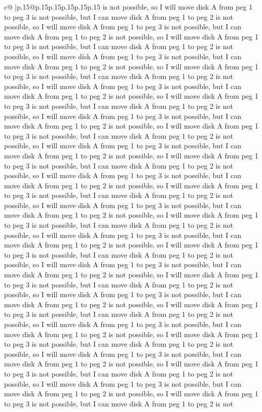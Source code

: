 \documentclass{article}
\begin{document}
{\begin{supertabular}{c@{$\;$}|p{.15\linewidth}@{}p{.15\linewidth}p{.15\linewidth}p{.15\linewidth}p{.15\linewidth}p{.15\linewidth}}
{{{is not possible, so I will move disk A from peg 1 to peg 3 is not possible, but I can move disk A from peg 1 to peg 2 is not possible, so I will move disk A from peg 1 to peg 3 is not possible, but I can move disk A from peg 1 to peg 2 is not possible, so I will move disk A from peg 1 to peg 3 is not possible, but I can move disk A from peg 1 to peg 2 is not possible, so I will move disk A from peg 1 to peg 3 is not possible, but I can move disk A from peg 1 to peg 2 is not possible, so I will move disk A from peg 1 to peg 3 is not possible, but I can move disk A from peg 1 to peg 2 is not possible, so I will move disk A from peg 1 to peg 3 is not possible, but I can move disk A from peg 1 to peg 2 is not possible, so I will move disk A from peg 1 to peg 3 is not possible, but I can move disk A from peg 1 to peg 2 is not possible, so I will move disk A from peg 1 to peg 3 is not possible, but I can move disk A from peg 1 to peg 2 is not possible, so I will move disk A from peg 1 to peg 3 is not possible, but I can move disk A from peg 1 to peg 2 is not possible, so I will move disk A from peg 1 to peg 3 is not possible, but I can move disk A from peg 1 to peg 2 is not possible, so I will move disk A from peg 1 to peg 3 is not possible, but I can move disk A from peg 1 to peg 2 is not possible, so I will move disk A from peg 1 to peg 3 is not possible, but I can move disk A from peg 1 to peg 2 is not possible, so I will move disk A from peg 1 to peg 3 is not possible, but I can move disk A from peg 1 to peg 2 is not possible, so I will move disk A from peg 1 to peg 3 is not possible, but I can move disk A from peg 1 to peg 2 is not possible, so I will move disk A from peg 1 to peg 3 is not possible, but I can move disk A from peg 1 to peg 2 is not possible, so I will move disk A from peg 1 to peg 3 is not possible, but I can move disk A from peg 1 to peg 2 is not possible, so I will move disk A from peg 1 to peg 3 is not possible, but I can move disk A from peg 1 to peg 2 is not possible, so I will move disk A from peg 1 to peg 3 is not possible, but I can move disk A from peg 1 to peg 2 is not possible, so I will move disk A from peg 1 to peg 3 is not possible, but I can move disk A from peg 1 to peg 2 is not possible, so I will move disk A from peg 1 to peg 3 is not possible, but I can move disk A from peg 1 to peg 2 is not possible, so I will move disk A from peg 1 to peg 3 is not possible, but I can move disk A from peg 1 to peg 2 is not possible, so I will move disk A from peg 1 to peg 3 is not possible, but I can move disk A from peg 1 to peg 2 is not possible, so I will move disk A from peg 1 to peg 3 is not possible, but I can move disk A from peg 1 to peg 2 is not possible, so I will move disk A from peg 1 to peg 3 is not possible, but I can move disk A from peg 1 to peg 2 is not possible, so I will move disk A from peg 1 to peg 3 is not possible, but I can move disk A from peg 1 to peg 2 is not possible, so I will move disk A from peg 1 to peg 3 is not possible, but I can move disk A from peg 1 to peg 2 is not possible, so I will move disk A from peg 1 to peg 3 is not possible, but I can move disk A from peg 1 to peg 2 is not }}}
\end{supertabular}}
\end{document}
